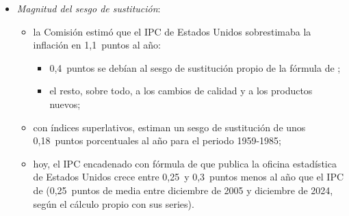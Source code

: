 \documentclass[11pt]{article}
\begin{document}
\begin{itemize}
\item \emph{Magnitud del sesgo de sustitución}:
  \begin{itemize}
  \item la Comisión  estimó que el IPC de Estados Unidos sobrestimaba la inflación en 1,1~puntos al año\nocite{Boskin1996Toward,Gordon2006Boskin}:
    \begin{itemize}
    \item 0,4~puntos se debían al sesgo de sustitución propio de la fórmula de ;
    \item el resto, sobre todo, a los cambios de calidad y a los productos nuevos;
    \end{itemize}
  \item con índices superlativos, \textcite{ManserMcDonald1988Substitution} estiman un sesgo de sustitución de unos 0,18~puntos porcentuales al año para el periodo 1959-1985;
  \item hoy, el IPC encadenado con fórmula de  que publica la oficina estadística de Estados Unidos crece entre 0,25~y 0,3~puntos menos al año que el IPC de  (0,25~puntos de media entre diciembre de 2005 y diciembre de 2024, según el cálculo propio con sus series)\nocite{BLS2026ChainedCPI,Klick2021Weight}.
  \end{itemize}
\end{itemize}
\end{document}
